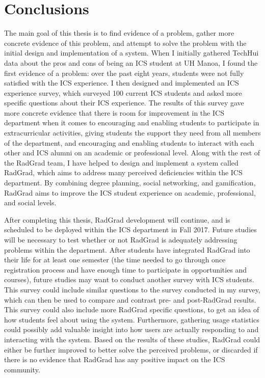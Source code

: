 \chapter{Conclusions}
The main goal of this thesis is to find evidence of a problem, gather more concrete evidence of this problem, and attempt to solve the problem with the initial design and implementation of a system. When I initially gathered TechHui data about the pros and cons of being an ICS student at UH Manoa, I found the first evidence of a problem: over the past eight years, students were not fully satisfied with the ICS experience. I then designed and implemented an ICS experience survey, which surveyed 100 current ICS students and asked more specific questions about their ICS experience. The results of this survey gave more concrete evidence that there is room for improvement in the ICS department when it comes to encouraging and enabling students to participate in extracurricular activities, giving students the support they need from all members of the department, and encouraging and enabling students to interact with each other and ICS alumni on an academic or professional level. Along with the rest of the RadGrad team, I have helped to design and implement a system called RadGrad, which aims to address many perceived deficiencies within the ICS department. By combining degree planning, social networking, and gamification, RadGrad aims to improve the ICS student experience on academic, professional, and social levels. 

After completing this thesis, RadGrad development will continue, and is scheduled to be deployed within the ICS department in Fall 2017. Future studies will be necessary to test whether or not RadGrad is adequately addressing problems within the department. After students have integrated RadGrad into their life for at least one semester (the time needed to go through once registration process and have enough time to participate in opportunities and courses), future studies may want to conduct another survey with ICS students. This survey could include similar questions to the survey conducted in my survey, which can then be used to compare and contrast pre- and post-RadGrad results. This survey could also include more RadGrad specific questions, to get an idea of how students feel about using the system. Furthermore, gathering usage statistics could possibly add valuable insight into how users are actually responding to and interacting with the system. Based on the results of these studies, RadGrad could either be further improved to better solve the perceived problems, or discarded if there is no evidence that RadGrad has any positive impact on the ICS community.

